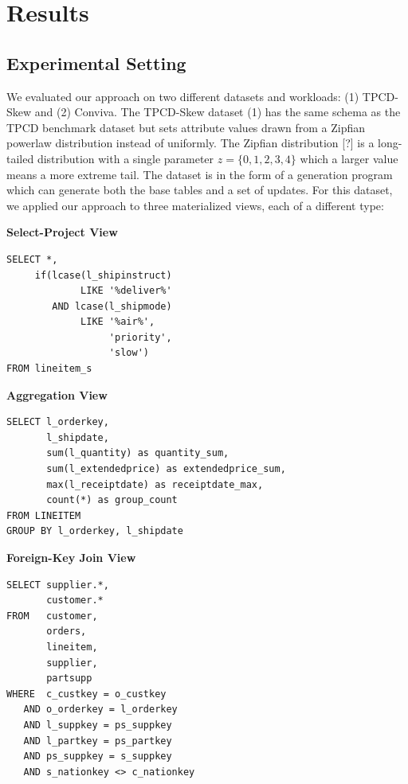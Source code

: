 \section{Results}

\subsection{Experimental Setting}
We evaluated our approach on two different datasets and workloads: (1) TPCD-Skew and (2) Conviva.
The TPCD-Skew dataset (1) has the same schema as the TPCD benchmark dataset but sets attribute values drawn from
a Zipfian powerlaw distribution instead of uniformly.
The Zipfian distribution [?] is a long-tailed distribution with a single parameter $z=\{0,1,2,3,4\}$ which a larger
value means a more extreme tail.
The dataset is in the form of a generation program which can generate both the base tables and a set of updates.
For this dataset, we applied our approach to three materialized views, each of a different type:

\vspace{1em}

\textbf{Select-Project View}
\begin{lstlisting}
SELECT *, 
     if(lcase(l_shipinstruct) 
     	     LIKE '%deliver%' 
        AND lcase(l_shipmode) 
             LIKE '%air%',
                  'priority',
                  'slow') 
FROM lineitem_s
\end{lstlisting}

\vspace{1em}

\textbf{Aggregation View}
\begin{lstlisting}
SELECT l_orderkey, 
       l_shipdate, 
       sum(l_quantity) as quantity_sum, 
       sum(l_extendedprice) as extendedprice_sum, 
       max(l_receiptdate) as receiptdate_max, 
       count(*) as group_count 
FROM LINEITEM 
GROUP BY l_orderkey, l_shipdate
\end{lstlisting}

\vspace{1em}

\textbf{Foreign-Key Join View}
\begin{lstlisting}
SELECT supplier.*, 
	   customer.* 
FROM   customer, 
       orders, 
       lineitem, 
       supplier, 
       partsupp 
WHERE  c_custkey = o_custkey 
   AND o_orderkey = l_orderkey 
   AND l_suppkey = ps_suppkey 
   AND l_partkey = ps_partkey 
   AND ps_suppkey = s_suppkey 
   AND s_nationkey <> c_nationkey
\end{lstlisting}

